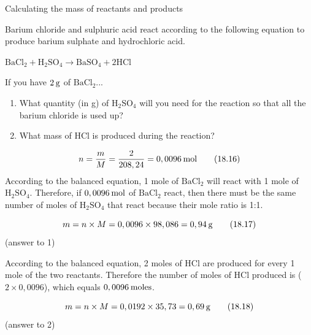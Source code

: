       \begin{wex}{ Calculating the mass of reactants and products }
{
      \label{m38717*id279063}Barium chloride and sulphuric acid react according to the following equation to produce barium sulphate and hydrochloric acid.\par 
      \label{m38717*id279070}
        ${\mathrm{BaCl}}_{2}+{\mathrm{H}}_{2}{\mathrm{SO}}_{4}\to {\mathrm{BaSO}}_{4}+2\mathrm{HCl}$
      \par 
      \label{m38717*id279141}If you have $2\phantom{\rule{2pt}{0ex}}\mathrm{g}$ of $\mathrm{BaCl}{}_{2}$...\par 
      \label{m38717*id279158}\begin{enumerate}[noitemsep, label=\textbf{\arabic*}. ] 
            \label{m38717*uid37}\item What quantity (in g) of $\mathrm{H}{}_{2}\mathrm{SO}{}_{4}$ will you need for the reaction so that all the barium chloride is used up?
\label{m38717*uid38}\item What mass of $\mathrm{HCl}$ is produced during the reaction?
\end{enumerate}
      \vspace{5pt}
}
{
        
    \begin{equation}
    n=\frac{m}{M}=\frac{2}{208,24}=0,0096\phantom{\rule{2pt}{0ex}}\mathrm{mol}\tag{18.16}
      \end{equation}
      \label{m38717*id279344}According to the balanced equation, 1 mole of $\mathrm{BaCl}{}_{2}$ will react with 1 mole of $\mathrm{H}{}_{2}\mathrm{SO}{}_{4}$. Therefore, if $0,0096\phantom{\rule{2pt}{0ex}}\mathrm{mol}$ of $\mathrm{BaCl}{}_{2}$ react, then there must be the same number of moles of $\mathrm{H}{}_{2}\mathrm{SO}{}_{4}$ that react because their mole ratio is 1:1.\par 
      \label{m38717*id279456}\nopagebreak\noindent{}
        
    \begin{equation}
    m=n\ensuremath{\times}M=0,0096\ensuremath{\times}98,086=0,94\phantom{\rule{2pt}{0ex}}\mathrm{g}\tag{18.17}
      \end{equation}
      \label{m38717*id279505}(answer to 1)\par 
      \label{m38717*id279513}According to the balanced equation, 2 moles of $\mathrm{HCl}$ are produced for every 1 mole of the two reactants. Therefore the number of moles of $\mathrm{HCl}$ produced is ($2\ensuremath{\times}0,0096$), which equals $0,0096\phantom{\rule{2pt}{0ex}}\mathrm{moles}$.\par 
      \label{m38717*id279531}\nopagebreak\noindent{}
        
    \begin{equation}
    m=n\ensuremath{\times}M=0,0192\ensuremath{\times}35,73=0,69\phantom{\rule{2pt}{0ex}}\mathrm{g}\tag{18.18}
      \end{equation}
      \label{m38717*id279580}(answer to 2)\par 
}
    \end{wex}
